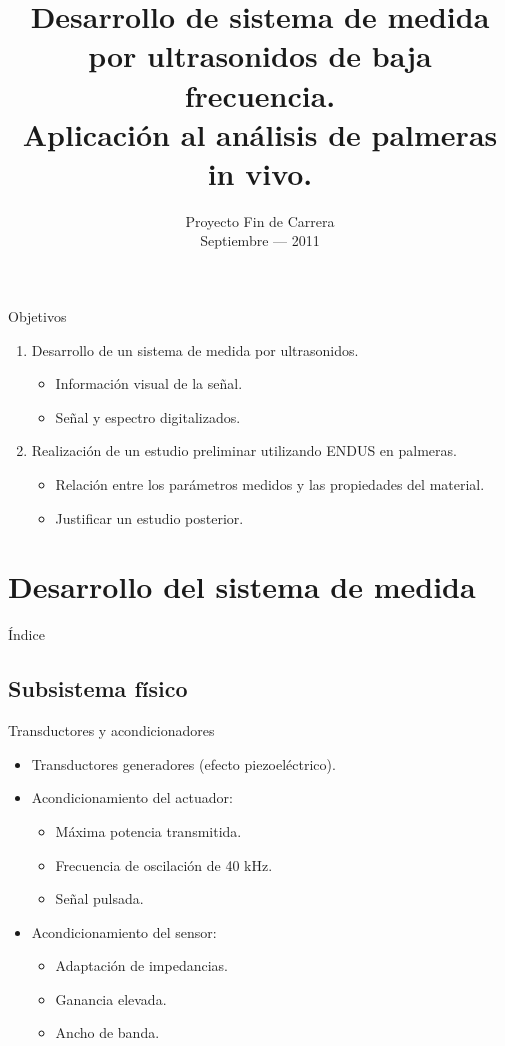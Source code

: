\documentclass[utf8, compress]			{beamer}
\title[ENDUS: Sistema de medida y aplicación en palmeras in vivo.]{
    Desarrollo de sistema de medida por ultrasonidos de baja frecuencia. \\
    Aplicación al análisis de palmeras in vivo.
}
\author[José Ramón Gisbert Valls]{
    \vbox{
	\makebox[\director][r]{AUTOR: José Ramón Gisbert Valls}
	\makebox[\director][r]{DIRECTOR: Alberto Rodríguez Martínez}
    }
}
\institute[Universidad Miguel Hernández de Elche]{
    Universidad Miguel Hernández de Elche \medskip\par
    Escuela Politécnica Superior de Elche
}
\date[Septiembre --- 2011]{
    Proyecto Fin de Carrera \\
    Septiembre --- 2011
}
\begin{document}
\frame[plain]{\titlepage}

\begin{frame}{Objetivos}
    \begin{enumerate}
	\item Desarrollo de un \alert{sistema de medida por
	    ultrasonidos}.
	    \begin{itemize}
		\item Información visual de la señal.
		\item Señal y espectro digitalizados.
	    \end{itemize}
	\item Realización de un estudio preliminar utilizando
	    \alert{ENDUS en palmeras}.
	    \begin{itemize}
		\item Relación entre los parámetros medidos y las propiedades
		    del material.
		\item Justificar un estudio posterior.
	    \end{itemize}
    \end{enumerate}
\end{frame}


\section{Desarrollo del sistema de medida}

\begin{frame}{Índice}
    \tableofcontents[currentsection]
\end{frame}


\subsection{Subsistema físico}

\begin{frame}{Transductores y acondicionadores}
    \begin{itemize}
	\item Transductores generadores (efecto piezoeléctrico).
	\item Acondicionamiento del actuador:
	    \begin{itemize}
		\item Máxima potencia transmitida.
		\item Frecuencia de oscilación de 40 kHz.
		\item Señal pulsada.
	    \end{itemize}
	\item Acondicionamiento del sensor:
	    \begin{itemize}
		\item Adaptación de impedancias.
		\item Ganancia elevada.
		\item Ancho de banda.
	    \end{itemize}
    \end{itemize}
\end{frame}
\end{document}
